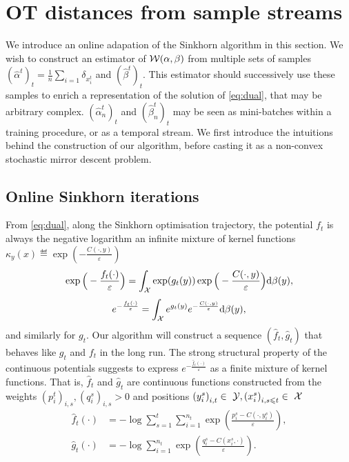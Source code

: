 
\section{OT distances from sample streams}

We introduce an online adapation of the Sinkhorn algorithm in this section. We
wish to construct an estimator of $\mathcal{W}(\alpha,\beta)$ from multiple sets of
samples $(\hat \alpha^t)_t = \frac{1}{n} \sum_{i=1} \delta_{x_i^t}$
 and $(\hat \beta^t)_t$. This estimator should
successively use these samples to enrich a representation of the solution of
\eqref{eq:dual}, that may be arbitrary complex. $(\hat \alpha_n^t)_t$ and $(\hat
\beta_n^t)_t$ may be seen as mini-batches within a training procedure, or as a
temporal stream. We first introduce the intuitions behind the construction of
our algorithm, before casting it as a non-convex stochastic mirror descent
problem.

\subsection{Online Sinkhorn iterations}

From \eqref{eq:dual}, along the Sinkhorn optimisation trajectory, the potential $f_t$ is always the negative logarithm an
infinite mixture of kernel functions $\kappa_y(x) \eqdef \exp(-\frac{C(\cdot, y)}{\varepsilon})$
\begin{equation*}
    \exp\Big(-\frac{f_t(\cdot)}{\varepsilon}\Big) = 
    \int_{\mathcal{X}} \exp(g_t(y))  \exp\Big(-\frac{C(\cdot, y)}{\varepsilon}\Big) \textrm{d} \beta(y),
\end{equation*}
\begin{equation*}
    e^{-\frac{f_t(\cdot)}{\varepsilon}} = 
    \int_{\mathcal{X}} e^{g_t(y)}  e^{-\frac{C(\cdot, y)}{\varepsilon}} \textrm{d} \beta(y),
\end{equation*}
and similarly for $g_t$. Our algorithm will construct a sequence $(\hat f_t,
\hat g_t)$ that behaves like $g_t$ and $f_t$ in the long run. The strong
structural property of the continuous potentials suggests to express $e^{-\frac{\hat f_t(\cdot)}{\varepsilon}}$ as a
finite mixture of kernel functions. That is, $\hat f_t$ and $\hat g_t$ are continuous
functions constructed from the weights ${(p_i^t)}_{i,s}, {(q_i^s)}_{i,s} > 0$ and positions
${(y_i^s)}_{i,t} \in~\mathcal{Y}, {(x_i^s)}_{i,s\leqslant t} \in~\mathcal{X}$ 
\begin{align}
    \hat f_t(\cdot) &= - \log \sum_{s=1}^t \sum_{i=1}^{n_t} 
    \exp(\frac{p_i^s - C(\cdot, y_i^s)}{\varepsilon}), \\
    \hat g_t(\cdot) &= - \log \sum_{i=1}^{n_t} 
    \exp(\frac{q_i^s - C(x_i^s, \cdot)}{\varepsilon}).
\end{align}

